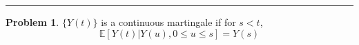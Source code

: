 \documentclass[a4paper, 10pt]{article}
\theoremstyle{definition}
\newtheorem{problem}{Problem}
\theoremstyle{hSol}
\begin{document}
\noindent\rule{16cm}{0.4pt}
\begin{problem} $\{Y(t)\}$ is a continuous martingale if for $s<t$,
$$
\mathbb{E}\left[Y(t)|Y(u), 0\leq u\leq s\right] = Y(s)
$$
\end{problem}
\end{document}
